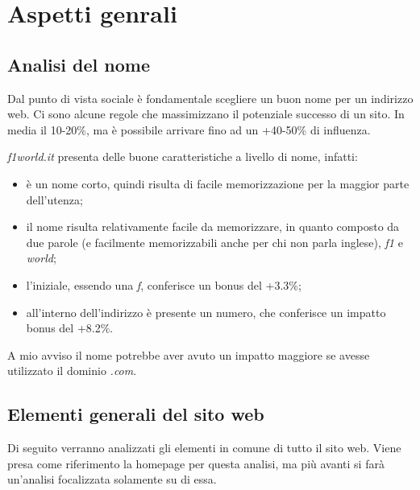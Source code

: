 \section{Aspetti genrali}

\subsection{Analisi del nome}
Dal punto di vista sociale \`e fondamentale scegliere un buon nome per un indirizzo web. Ci sono alcune regole che massimizzano il potenziale successo di un sito. In media il 10-20\%, ma \`e possibile arrivare fino ad un +40-50\% di influenza.

\textit{f1world.it} presenta delle buone caratteristiche a livello di nome, infatti:
\begin{itemize}

\item \`e un nome corto, quindi risulta di facile memorizzazione per la maggior parte dell'utenza;
\item il nome risulta relativamente facile da memorizzare, in quanto composto da due parole (e facilmente memorizzabili anche per chi non parla inglese), \textit{f1} e \textit{world};
\item l'iniziale, essendo una \textit{f}, conferisce un bonus del +3.3\%;
\item all'interno dell'indirizzo \`e presente un numero, che conferisce un impatto bonus del +8.2\%.
\end{itemize}

A mio avviso il nome potrebbe aver avuto un impatto maggiore se avesse utilizzato il dominio \textit{.com}.


\subsection{Elementi generali del sito web}

Di seguito verranno analizzati gli elementi in comune di tutto il sito web. Viene presa come riferimento la homepage per questa analisi, ma pi\`u avanti si far\`a un'analisi focalizzata solamente su di essa.

